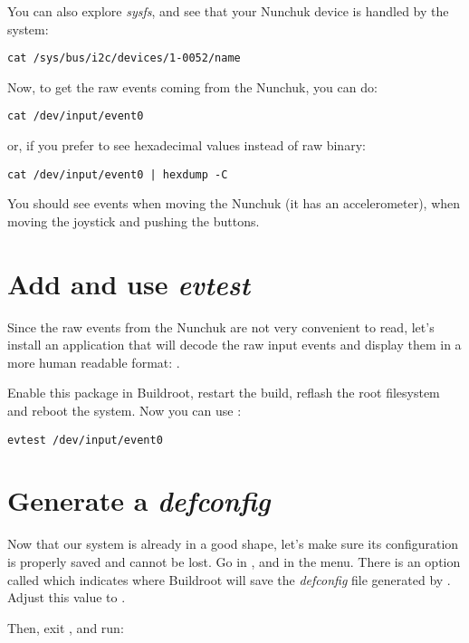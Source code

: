 You can also explore {\em sysfs}, and see that your Nunchuk device is
handled by the system:

\begin{verbatim}
cat /sys/bus/i2c/devices/1-0052/name
\end{verbatim}

Now, to get the raw events coming from the Nunchuk, you can do:

\begin{verbatim}
cat /dev/input/event0
\end{verbatim}

or, if you prefer to see hexadecimal values instead of raw binary:

\begin{verbatim}
cat /dev/input/event0 | hexdump -C
\end{verbatim}

You should see events when moving the Nunchuk (it has an
accelerometer), when moving the joystick and pushing the buttons.

\section{Add and use {\em evtest}}

Since the raw events from the Nunchuk are not very convenient to read,
let's install an application that will decode the raw input events
and display them in a more human readable format: .

Enable this package in Buildroot, restart the build, reflash the root
filesystem and reboot the system. Now you can use :

\begin{verbatim}
evtest /dev/input/event0
\end{verbatim}

\section{Generate a {\em defconfig}}

Now that our system is already in a good shape, let's make sure its
configuration is properly saved and cannot be lost. Go in
, and in the  menu. There is an
option called  which indicates
where Buildroot will save the {\em defconfig} file generated by
. Adjust this value to
.

Then, exit , and run:

